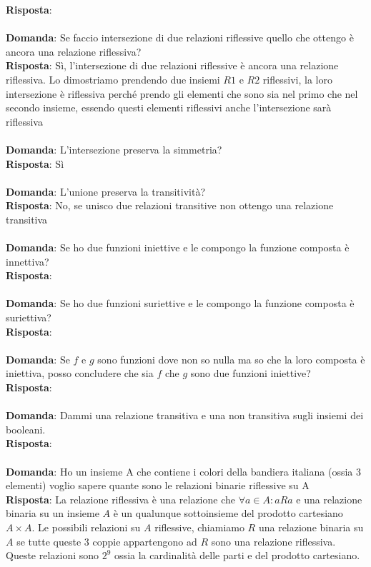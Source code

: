 \documentclass{article}
\begin{document}
\textbf{Risposta}: \\ \\
\textbf{Domanda}: Se faccio intersezione di due relazioni riflessive quello che ottengo è ancora una relazione riflessiva? \\
\textbf{Risposta}: Sì, l'intersezione di due relazioni riflessive è ancora una relazione riflessiva. Lo dimostriamo prendendo due insiemi $R1$ e $R2$ riflessivi, la loro intersezione è riflessiva perché prendo gli elementi che sono sia nel primo che nel secondo insieme, essendo questi elementi riflessivi anche l'intersezione sarà riflessiva \\ \\
\textbf{Domanda}: L'intersezione preserva la simmetria? \\
\textbf{Risposta}: Sì \\ \\
\textbf{Domanda}: L'unione preserva la transitività? \\
\textbf{Risposta}: No, se unisco due relazioni transitive non ottengo una relazione transitiva \\ \\
\textbf{Domanda}: Se ho due funzioni iniettive e le compongo la funzione composta è innettiva? \\
\textbf{Risposta}: \\ \\
\textbf{Domanda}: Se ho due funzioni suriettive e le compongo la funzione composta è suriettiva? \\
\textbf{Risposta}: \\ \\
\textbf{Domanda}: Se $f$ e $g$ sono funzioni dove non so nulla ma so che la loro composta è iniettiva, posso concludere che sia $f$ che $g$ sono due funzioni iniettive? \\
\textbf{Risposta}: \\ \\
\textbf{Domanda}: Dammi una relazione transitiva e una non transitiva sugli insiemi dei booleani. \\
\textbf{Risposta}: \\ \\
\textbf{Domanda}: Ho un insieme A che contiene i colori della bandiera italiana (ossia 3 elementi) voglio sapere quante sono le relazioni binarie riflessive su A\\
\textbf{Risposta}: La relazione riflessiva è una relazione che $\forall a \in A: aRa$ e una relazione binaria su un insieme $A$ è un qualunque sottoinsieme del prodotto cartesiano $A \times A$. 
Le possibili relazioni su $A$ riflessive, chiamiamo $R$ una relazione binaria su $A$ se tutte queste 3 coppie appartengono ad $R$ sono una relazione riflessiva.
Queste relazioni sono  $2^9$ ossia la cardinalità delle parti e del prodotto cartesiano.\\ \\
\end{document}
